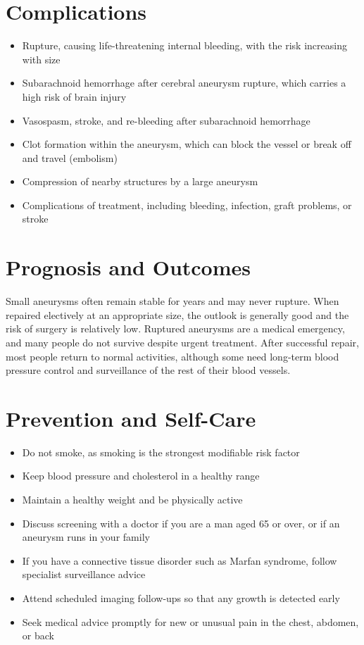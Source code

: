 \section*{Complications}
\begin{itemize}
    \item Rupture, causing life-threatening internal bleeding, with the risk increasing with size
    \item Subarachnoid hemorrhage after cerebral aneurysm rupture, which carries a high risk of brain injury
    \item Vasospasm, stroke, and re-bleeding after subarachnoid hemorrhage
    \item Clot formation within the aneurysm, which can block the vessel or break off and travel (embolism)
    \item Compression of nearby structures by a large aneurysm
    \item Complications of treatment, including bleeding, infection, graft problems, or stroke
\end{itemize}

\section*{Prognosis and Outcomes}
Small aneurysms often remain stable for years and may never rupture. When repaired electively at an appropriate size, the outlook is generally good and the risk of surgery is relatively low. Ruptured aneurysms are a medical emergency, and many people do not survive despite urgent treatment. After successful repair, most people return to normal activities, although some need long-term blood pressure control and surveillance of the rest of their blood vessels.

\section*{Prevention and Self-Care}
\begin{itemize}
    \item Do not smoke, as smoking is the strongest modifiable risk factor
    \item Keep blood pressure and cholesterol in a healthy range
    \item Maintain a healthy weight and be physically active
    \item Discuss screening with a doctor if you are a man aged 65 or over, or if an aneurysm runs in your family
    \item If you have a connective tissue disorder such as Marfan syndrome, follow specialist surveillance advice
    \item Attend scheduled imaging follow-ups so that any growth is detected early
    \item Seek medical advice promptly for new or unusual pain in the chest, abdomen, or back
\end{itemize}

